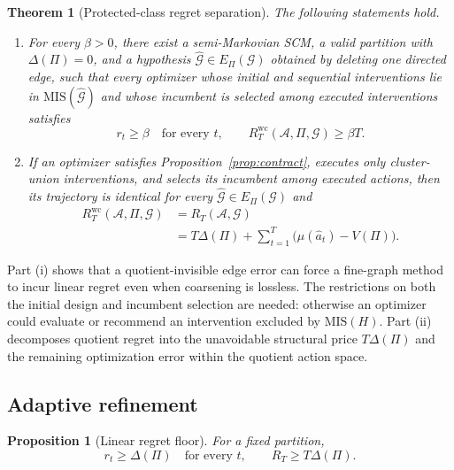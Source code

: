 \documentclass[twoside]{article}
\newtheorem{theorem}{Theorem}
\newtheorem{proposition}{Proposition}
\newcommand{\Gg}{\mathcal{G}}
\begin{document}
\begin{theorem}[Protected-class regret separation]
\label{thm:separation}
The following statements hold.
\begin{enumerate}[label=(\roman*),leftmargin=1.6em,itemsep=2pt,topsep=2pt]
  \item For every $\beta>0$, there exist a semi-Markovian SCM, a valid partition with $\Delta(\Pi)=0$, and a hypothesis $\widehat{\mathcal G}\in E_\Pi(\Gg)$ obtained by deleting one directed edge, such that every optimizer whose initial and sequential interventions lie in $\mathrm{MIS}(\widehat{\mathcal G})$ and whose incumbent is selected among executed interventions satisfies
  \[
    r_t\ge\beta\quad\text{for every }t,
    \qquad R_T^{\mathrm{wc}}(\mathcal A,\Pi,\Gg)\ge\beta T.
  \]
  \item If an optimizer satisfies Proposition~\ref{prop:contract}, executes only cluster-union interventions, and selects its incumbent among executed actions, then its trajectory is identical for every $\widehat{\mathcal G}\in E_\Pi(\Gg)$ and
  \[
  \begin{aligned}
  R_T^{\mathrm{wc}}(\mathcal A,\Pi,\Gg)
  &=R_T(\mathcal A,\Gg)\\
  &=T\Delta(\Pi)
   +\sum_{t=1}^{T}\bigl(\mu(\hat a_t)-V(\Pi)\bigr).
  \end{aligned}
  \]
\end{enumerate}
\end{theorem}

Part (i) shows that a quotient-invisible edge error can force a fine-graph method to incur linear regret even when coarsening is lossless. The restrictions on both the initial design and incumbent selection are needed: otherwise an optimizer could evaluate or recommend an intervention excluded by $\mathrm{MIS}(H)$. Part (ii) decomposes quotient regret into the unavoidable structural price $T\Delta(\Pi)$ and the remaining optimization error within the quotient action space.

\subsection{Adaptive refinement}
\label{sec:refinement}

\begin{proposition}[Linear regret floor]
\label{prop:floor}
For a fixed partition,
\[
 r_t\ge\Delta(\Pi)\quad\text{for every }t,
 \qquad R_T\ge T\Delta(\Pi).
\]
\end{proposition}
\end{document}
